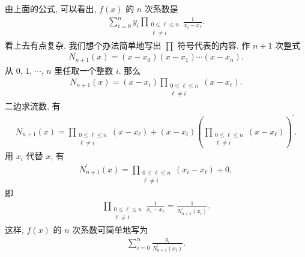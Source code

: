 \begin{remark}
    由上面的公式, 可以看出, $f(x)$ 的 $n$ 次系数是
    \begin{align*}
        \sum_{i = 0}^{n} y_i \prod_{\begin{smallmatrix}0 \leq \ell \leq n \\\ell \neq i\end{smallmatrix}} \frac{1}{x_i - x_\ell}.
    \end{align*}
    看上去有点复杂. 我们想个办法简单地写出 $\prod$ 符号代表的内容. 作 $n+1$ 次整式
    \begin{align*}
        N_{n+1} (x) = (x - x_0) (x - x_1) \cdots (x - x_n).
    \end{align*}
    从 $0$, $1$, $\cdots$, $n$ 里任取一个整数 $i$. 那么
    \begin{align*}
        N_{n+1} (x) = (x - x_i) \prod_{\begin{smallmatrix}0 \leq \ell \leq n \\\ell \neq i\end{smallmatrix}} (x - x_\ell).
    \end{align*}
    二边求流数, 有
    \begin{align*}
        N_{n+1} (x) = \prod_{\begin{smallmatrix}0 \leq \ell \leq n \\\ell \neq i\end{smallmatrix}} (x - x_\ell) + (x - x_i) \left( \prod_{\begin{smallmatrix}0 \leq \ell \leq n \\\ell \neq i\end{smallmatrix}} (x - x_\ell) \right)^{\prime}.
    \end{align*}
    用 $x_i$ 代替 $x$, 有
    \begin{align*}
        N_{n+1}^{\prime} (x) = \prod_{\begin{smallmatrix}0 \leq \ell \leq n \\\ell \neq i\end{smallmatrix}} (x_i - x_\ell) + 0,
    \end{align*}
    即
    \begin{align*}
        \prod_{\begin{smallmatrix}0 \leq \ell \leq n \\\ell \neq i\end{smallmatrix}} \frac{1}{x_i - x_\ell} = \frac{1}{N_{n+1}^{\prime} (x_i)}.
    \end{align*}
    这样, $f(x)$ 的 $n$ 次系数可简单地写为
    \begin{align*}
        \sum_{i = 0}^{n} \frac{y_i}{N_{n+1}^{\prime} (x_i)}.
    \end{align*}
\end{remark}

